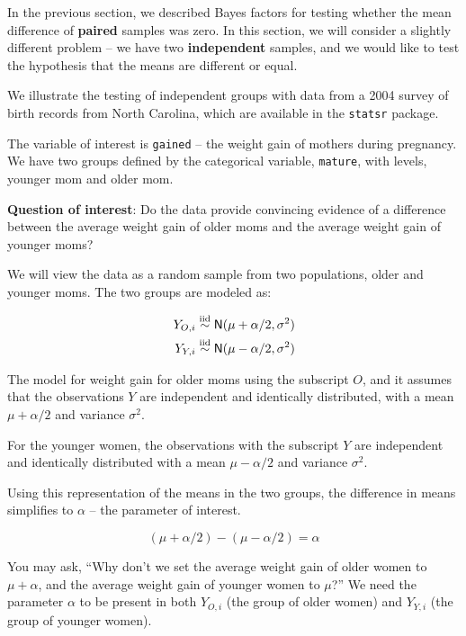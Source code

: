 \documentclass[]{book}
\theoremstyle{definition}
\theoremstyle{definition}
\theoremstyle{definition}
\theoremstyle{remark}
\let\BeginKnitrBlock\begin \let\EndKnitrBlock\end
\begin{document}
In the previous section, we described Bayes factors for testing whether
the mean difference of \textbf{paired} samples was zero. In this
section, we will consider a slightly different problem -- we have two
\textbf{independent} samples, and we would like to test the hypothesis
that the means are different or equal.

\BeginKnitrBlock{example}
\protect\hypertarget{exm:birth-records}{}{\label{exm:birth-records} }We
illustrate the testing of independent groups with data from a 2004
survey of birth records from North Carolina, which are available in the
\texttt{statsr} package.

The variable of interest is \texttt{gained} -- the weight gain of
mothers during pregnancy. We have two groups defined by the categorical
variable, \texttt{mature}, with levels, younger mom and older mom.

\textbf{Question of interest}: Do the data provide convincing evidence
of a difference between the average weight gain of older moms and the
average weight gain of younger moms?
\EndKnitrBlock{example}

We will view the data as a random sample from two populations, older and
younger moms. The two groups are modeled as:

\begin{equation}
\begin{split}
Y_{O,i} &\mathrel{\mathop{\sim}\limits^{\rm iid}} \textsf{N}(\mu + \alpha/2, \sigma^2) \\
Y_{Y,i} &\mathrel{\mathop{\sim}\limits^{\rm iid}} \textsf{N}(\mu - \alpha/2, \sigma^2)
\end{split}
\label{eq:half-alpha}
\end{equation}

The model for weight gain for older moms using the subscript \(O\), and
it assumes that the observations \(Y\) are independent and identically
distributed, with a mean \(\mu+\alpha/2\) and variance \(\sigma^2\).

For the younger women, the observations with the subscript \(Y\) are
independent and identically distributed with a mean \(\mu-\alpha/2\) and
variance \(\sigma^2\).

Using this representation of the means in the two groups, the difference
in means simplifies to \(\alpha\) -- the parameter of interest.

\[(\mu + \alpha/2)  - (\mu - \alpha/2) =  \alpha\]

You may ask, ``Why don't we set the average weight gain of older women
to \(\mu+\alpha\), and the average weight gain of younger women to
\(\mu\)?'' We need the parameter \(\alpha\) to be present in both
\(Y_{O,i}\) (the group of older women) and \(Y_{Y,i}\) (the group of
younger women).
\end{document}
